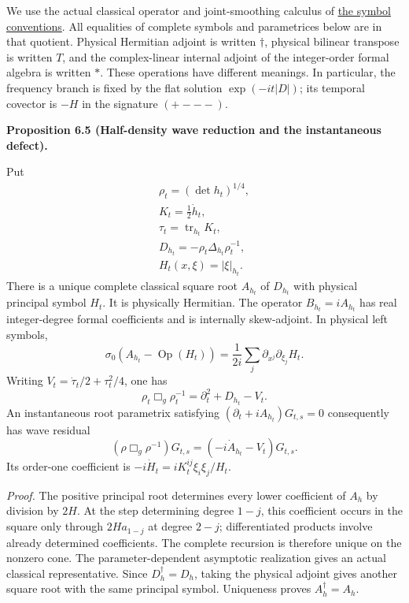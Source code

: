 \documentclass[
  english,
  11pt,
  reqno]{amsart}
\makeatletter
\newcommand{\pandocstatementheading}[1]{%
  \par\if@nobreak\else
    \addpenalty{\@beginparpenalty}%
    \addvspace{.5\baselineskip plus .2\baselineskip minus .2\baselineskip}%
  \fi
  {\normalfont\bfseries #1\par}%
  \nobreak\@afterindenttrue\@afterheading
}
\makeatother
\begin{document}
We use the actual classical operator and joint-smoothing calculus of
\hyperref[def:online-complete-symbol-calculus]{the symbol conventions}.
All equalities of complete symbols and parametrices below are in that
quotient. Physical Hermitian adjoint is written \(\dagger\), physical
bilinear transpose is written \(T\), and the complex-linear internal
adjoint of the integer-order formal algebra is written \(*\). These
operations have different meanings. In particular, the frequency branch
is fixed by the flat solution \(\exp(-it|D|)\); its temporal covector is
\(-H\) in the signature \((+---)\).

\pandocstatementheading{\leavevmode{}\label{prop:online-wave-half-density-reduction}Proposition 6.5 (Half-density wave reduction and the instantaneous
defect).}

Put%
 \[
\begin{gathered}
\rho_t=(\det h_t)^{1/4}, \\
K_t=\tfrac12\dot h_t, \\
\tau_t=\operatorname{tr}_{h_t}K_t, \\
D_{h_t}=-\rho_t\Delta_{h_t}\rho_t^{-1}, \\
H_t(x,\xi)=|\xi|_{h_t}.
\end{gathered}
\] There is a unique complete classical square root \(A_{h_t}\) of
\(D_{h_t}\) with physical principal symbol \(H_t\). It is physically
Hermitian. The operator \(B_{h_t}=iA_{h_t}\) has real integer-degree
formal coefficients and is internally skew-adjoint. In physical left
symbols,%
 \[
\sigma_0(A_{h_t}-\operatorname{Op}(H_t))
=\frac1{2i}\sum_j\partial_{x^j}\partial_{\xi_j}H_t.
\] Writing \(V_t=\dot\tau_t/2+\tau_t^2/4\), one has%
 \[
\rho_t\Box_g\rho_t^{-1}
=\partial_t^2+D_{h_t}-V_t.
\] An instantaneous root parametrix satisfying
\((\partial_t+iA_{h_t})G_{t,s}=0\) consequently has wave residual%
 \[
(\rho\Box_g\rho^{-1})G_{t,s}
=(-i\dot A_{h_t}-V_t)G_{t,s}.
\] Its order-one coefficient is \(-i\dot H_t=iK_t^{ij}\xi_i\xi_j/H_t\).

\emph{Proof.} The positive principal root determines every lower
coefficient of \(A_h\) by division by \(2H\). At the step determining
degree \(1-j\), this coefficient occurs in the square only through
\(2H a_{1-j}\) at degree \(2-j\); differentiated products involve
already determined coefficients. The complete recursion is therefore
unique on the nonzero cone. The parameter-dependent asymptotic
realization gives an actual classical representative. Since
\(D_h^\dagger=D_h\), taking the physical adjoint gives another square
root with the same principal symbol. Uniqueness proves
\(A_h^\dagger=A_h\).
\end{document}
